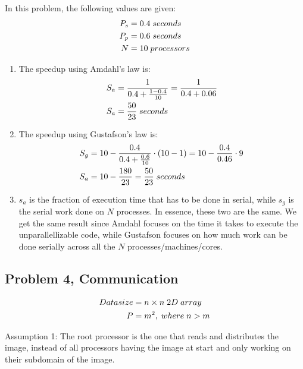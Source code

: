 \documentclass[fontsize=11pt, paper=a4, titlepage]{article}
\begin{document}
In this problem, the following values are given:
\begin{align*}
    P_s &= 0.4\thickspace seconds \\
    P_p &= 0.6\thickspace seconds \\
    N &= 10\thickspace processors
\end{align*}

\begin{enumerate}
\renewcommand{\theenumi}{\alph{enumi})}
    \item The speedup using Amdahl's law is:
    \begin{align*}
        S_a &= \frac{1}{0.4 + \frac{1-0.4}{10}} = \frac{1}{0.4+0.06} \\
        S_a &= \frac{50}{23}\thickspace seconds
    \end{align*}

    \item The speedup using Gustafson's law is:
    \begin{align*}
        S_g &= 10 - \frac{0.4}{0.4 + \frac{0.6}{10}}\cdot (10-1) = 10 - \frac{0.4}{0.46}\cdot 9 \\
        S_a &= 10 - \frac{180}{23} = \frac{50}{23}\thickspace seconds
    \end{align*}

    \item $s_a$ is the fraction of execution time that has to be done in serial,
while $s_g$ is the serial work done on $N$ processes. In essence, these two are
the same. We get the same result since Amdahl focuses on the time it takes to
execute the unparallellizable code, while Gustafson focuses on how much work can
be done serially across all the $N$ processes/machines/cores.

\end{enumerate}

\subsection{Problem 4, Communication}
\renewcommand{\theenumi}{\alph{enumi})}
\begin{align*}
    Datasize &= n\times n\thickspace 2D\thickspace array \\
    P &= m^2,\thickspace where\thickspace n > m
\end{align*}

Assumption 1: The root processor is the one that reads and distributes the
image, instead of all processors having the image at start and only working on
their subdomain of the image.
\end{document}
